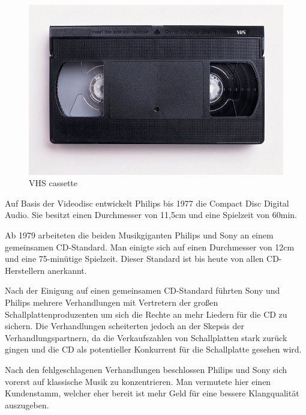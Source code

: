 \begin{figure}[h]
\begin{center}
\begin{minipage}[t]{0.3\textwidth}
\begin{center}
                \includegraphics[height=0.1\textheight]{Bilder/Optische_Datentraeger_Die_Compact_Disc/Geschichte/vhs.png}
                \caption[VHS cassette \newline \url{https://upload.wikimedia.org/wikipedia/commons/6/67/VHS-cassette.jpg}]{VHS cassette}
                \label{fig:vhs}
            \end{center}
        \end{minipage}
    \end{center}
\end{figure}

Auf Basis der Videodisc entwickelt Philips bis 1977 die Compact Disc Digital
Audio. Sie besitzt einen Durchmesser von 11,5cm und eine Spielzeit von 60min.

Ab 1979 arbeiteten die beiden Musikgiganten Philips und Sony an einem
gemeinsamen CD-Standard. Man einigte sich auf einen Durchmesser von 12cm und
eine 75-minütige Spielzeit. Dieser Standard ist bis heute von allen
CD-Herstellern anerkannt. \cite{cds}

Nach der Einigung auf einen gemeinsamen CD-Standard führten Sony und Philips
mehrere Verhandlungen mit Vertretern der großen Schallplattenproduzenten um sich
die Rechte an mehr Liedern für die CD zu sichern. Die Verhandlungen scheiterten
jedoch an der Skepsis der Verhandlungspartnern, da die Verkaufszahlen von
Schallplatten stark zurück gingen und die CD als potentieller Konkurrent für die
Schallplatte gesehen wird.

Nach den fehlgeschlagenen Verhandlungen beschlossen Philips und Sony sich
vorerst auf klassische Musik zu konzentrieren. Man vermutete hier einen
Kundenstamm, welcher eher bereit ist mehr Geld für eine bessere Klangqualität
auszugeben.

